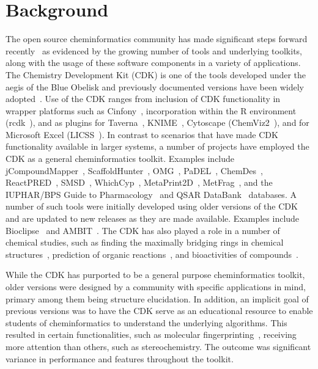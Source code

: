 \documentclass[doublespacing]{bmcart}
\begin{document}
\section*{Background}

The open source cheminformatics community has made significant steps
forward recently~\cite{OBoyle2011b} as evidenced by the growing number
of tools and underlying toolkits, along with the usage of these
software components in a variety of applications.
The Chemistry Development Kit (CDK) is one of the tools developed
under the aegis of the Blue Obelisk 
and previously documented versions have been widely adopted~\cite{Steinbeck2003,Steinbeck2006}.
Use of the CDK ranges from inclusion of CDK functionality in
wrapper platforms such as Cinfony~\cite{OBoyle2008}, incorporation
within the R environment (rcdk~\cite{Guha2007}), and as plugins for
Taverna~\cite{Truszkowski2011}, 
KNIME~\cite{Beisken2013}, Cytoscape (ChemViz2~\cite{ChemViz2}), and for
Microsoft Excel (LICSS~\cite{Lawson2012}).
In contrast to scenarios that have made CDK functionality available in
larger systems, a number of projects have employed the CDK as a
general cheminformatics toolkit. Examples include 
jCompoundMapper~\cite{Hinselmann2011}, ScaffoldHunter~\cite{wetzel2009interactive,Klein2013}, OMG~\cite{Peironcely2012},
PaDEL~\cite{yap2011padel}, ChemDes~\cite{Dong2015},
ReactPRED~\cite{ReactPRED}, SMSD~\cite{Rahman2009,Rahman2014,Rahman2016},
WhichCyp~\cite{Rostkowski2013}, MetaPrint2D~\cite{Carlsson2010}, MetFrag~\cite{Wolf2010},
and the IUPHAR/BPS Guide to Pharmacology~\cite{Southan2016} and
QSAR DataBank~\cite{Ruusmann2015} databases.
A number of such tools were initially developed using older versions
of the CDK and are updated to new releases as they are made
available. Examples include Bioclipse~\cite{spjuth2007bioclipse,
spjuth2009bioclipse} and
AMBIT~\cite{jeliazkova2011ambit,jeliazkova2011ambitsmarts,kochev2013ambit}. The
CDK has also played a role in a number of chemical studies, such as finding
the maximally bridging rings in chemical structures~\cite{Marth2015},
prediction of organic reactions~\cite{Segler2016}, and bioactivities
of compounds~\cite{Alvarsson2016}.

While the CDK has purported to be a general purpose cheminformatics
toolkit, older versions were designed by a community with specific
applications in mind, primary among them being structure elucidation. In
addition, an implicit goal of previous versions was to have the CDK
serve as an educational resource to enable students of cheminformatics
to understand the underlying algorithms. This resulted in certain
functionalities, such as molecular fingerprinting~\cite{Clark2014,Cannon2006},
receiving more attention than others, such as stereochemistry. The
outcome was significant variance in performance and features
throughout the toolkit.
\end{document}
